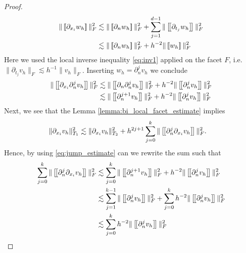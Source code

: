 \begin{proof}
\begin{equation}
    \begin{split}
   \| \jump{ \partial _{x_{i}} w_{h} }   \|_{F  }^{2  } & \lesssim \| \jump{ \partial _{n} w_{h} }   \|_{F  }^{ 2 } + \sum_{j=1}^{d-1} \| \jump{ \partial _{t_{j}} w_{h} }   \|_{ F }^{ 2 } \\
    & \lesssim \| \jump{ \partial _{n} w_{h} }   \|_{F  }^{ 2 } +  h^{-2} \| \jump{ w_{h} }   \|_{ F }^{ 2 }
    \end{split}
\end{equation}
Here we used the local inverse inequality \eqref{eq:inv1} applied on the facet $F$, i.e. $\| \partial _{t_{j}} v_{h} \|_{F  }^{  } \lesssim h^{-1} \|  v_{h} \|_{F  }^{  }  $.
Inserting $w_{h} = \partial ^{j} _{n} v_{h}$ we conclude
\begin{equation}
    \label{eq:jump_estimate}
    \begin{split}
   \| \jump{ \partial _{x_{i}} \partial ^{j} _{n} v_{h} }   \|_{F  }^{2  } & \lesssim \| \jump{ \partial _{n} \partial ^{j} _{n} v_{h} }   \|_{F  }^{ 2 } +  h^{-2} \| \jump{ \partial ^{j} _{n} v_{h} }   \|_{ F }^{ 2 } \\
                                                                           & \lesssim \| \jump{  \partial ^{j+1} _{n} v_{h} }   \|_{F  }^{ 2 } +  h^{-2} \| \jump{ \partial ^{j} _{n} v_{h} }   \|_{ F }^{ 2 } \\
    \end{split}
\end{equation}
Next, we see that the Lemma \ref{lemma:bi_local_facet_estimate} implies
\begin{equation}
    \label{eq:ghost_estimate:1}
    \begin{split}
    \| \partial _{x_{i}} v_{h} \|_{  T_{1}}^{2  } & \lesssim \| \partial _{x_{i}} v_{h} \|_{ T_{2} }^{  2} + h^{2j+1}\sum_{j=0}^{k} \| \left[\!\left[  \partial _{n}^{j} \partial _{x_{i}} v_{h}  \right]\!\right]   \|_{F  }^{2  }.
    \end{split}
\end{equation}
Hence, by using \eqref{eq:jump_estimate} can we rewrite the sum such that
\begin{equation}
    \label{eq:ghost_estimate:2}
    \begin{split}
                                                  \sum_{j=0}^{k} \| \jump{ \partial _{n}^{j} \partial _{x_{i}} v_{h} }   \|_{F  }^{2  } & \lesssim  \sum_{j=0}^{k} \| \jump{  \partial ^{j+1} _{n} v_{h} }   \|_{F  }^{ 2 } +  h^{-2} \| \jump{ \partial ^{j} _{n} v_{h} }   \|_{ F }^{ 2 } \\
                                                  & \lesssim  \sum_{j=1}^{k-1} \| \jump{  \partial ^{j} _{n} v_{h} }   \|_{F  }^{ 2 } +\sum_{j=0}^{k}  h^{-2} \| \jump{ \partial ^{j} _{n} v_{h} }   \|_{ F
                                                  }^{ 2 } \\
                                                  & \lesssim  \sum_{j=0}^{k}  h^{-2} \| \jump{ \partial ^{j} _{n} v_{h} }   \|_{ F }^{ 2 }
    \end{split}
\end{equation}


\end{proof}
